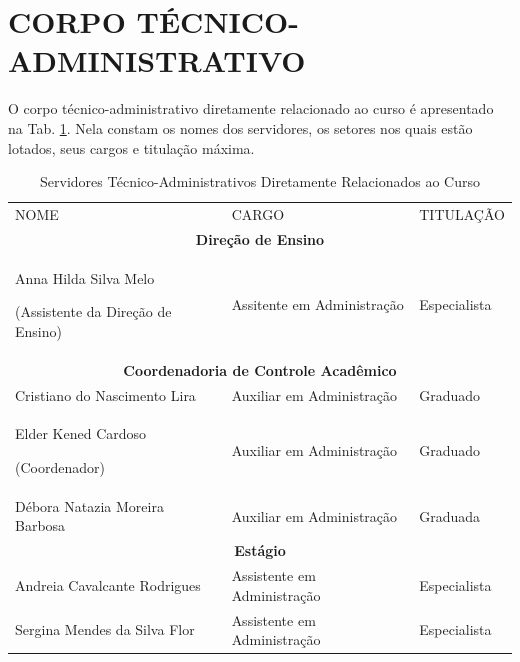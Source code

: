 \section{CORPO TÉCNICO-ADMINISTRATIVO}

O corpo técnico-administrativo diretamente relacionado ao curso é apresentado na Tab. \ref{tab3}. Nela constam os nomes dos servidores, os setores nos quais estão lotados, seus cargos e titulação máxima.


\begin{longtable}{|p{6cm}|p{5.5cm}|p{2.3cm}|}
	\caption{Servidores Técnico-Administrativos Diretamente Relacionados ao Curso}\label{tab3} 
	\vspace{-0.25cm}
	\\ \hline 
	\cellcolor{\cinza}NOME & \cellcolor{\cinza}CARGO & \cellcolor{\cinza}TITULAÇÃO \\ 
	\hline
	
	
	\multicolumn{3}{|c|}{\textbf{Direção de Ensino}} \\
	\hline
	Anna Hilda Silva Melo 
	
	(Assistente da Direção de Ensino) & Assitente em Administração & Especialista \\ \hline
	
	\multicolumn{3}{|c|}{\textbf{Coordenadoria de Controle Acadêmico}} \\
	\hline
	Cristiano do Nascimento Lira & Auxiliar em Administração &	Graduado \\ \hline
	Elder Kened Cardoso 
	
	(Coordenador) &	Auxiliar em Administração & Graduado \\ \hline 
	Débora Natazia Moreira Barbosa & Auxiliar em Administração & Graduada \\ \hline
	
	\multicolumn{3}{|c|}{\textbf{Estágio}} \\
	\hline
	Andreia Cavalcante Rodrigues & Assistente em Administração & Especialista  \\ \hline
	Sergina Mendes da Silva Flor & Assistente em Administração & Especialista \\ \hline
	

\end{longtable}
